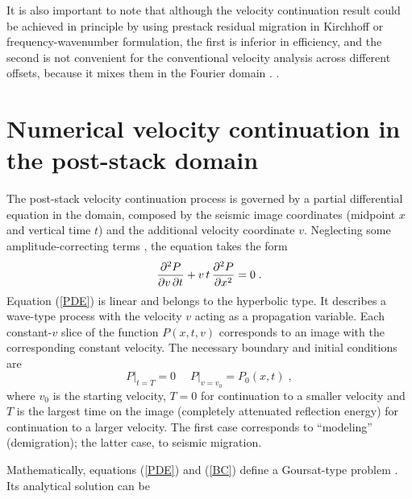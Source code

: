 It is also important to note that although the velocity continuation result
could be achieved in principle by using prestack residual migration in
Kirchhoff \cite[]{Etgen.sepphd.68} or frequency-wavenumber
\cite[]{GEO61-02-06050607} formulation, the first is inferior in efficiency, and
the second is not convenient for the conventional velocity analysis across
different offsets, because it mixes them in the Fourier domain
\cite[]{SEG-2000-09920995}.  
\cite[]{SEG-2001-02960299,sandf}  \cite{adler}.

\section{Numerical velocity continuation in the post-stack domain}
\par
The post-stack velocity continuation process is governed by a partial
differential equation in the domain, composed by the seismic image
coordinates (midpoint $x$ and vertical time $t$) and the additional
velocity coordinate $v$. Neglecting some amplitude-correcting terms
\cite[]{first}, the equation takes the form
\cite[]{Claerbout.sep.48.79}
\begin{equation}
  \label{PDE}
  {{\partial^2 P} \over {\partial v\, \partial t}} +
  v\,t\,{{\partial^2 P} \over {\partial x^2}} = 0\;.
\end{equation}
Equation (\ref{PDE}) is linear and belongs to the hyperbolic type. It
describes a wave-type process with the velocity $v$ acting as a
propagation variable. Each constant-$v$ slice of the function
$P(x,t,v)$ corresponds to an image with the corresponding constant
velocity. The necessary boundary and initial conditions are 
\begin{equation}
  \label{BC}
  \left.P\right|_{t=T} = 0\;\quad \left.P\right|_{v=v_0} = P_0 (x,t)\;,
\end{equation}
where $v_0$ is the starting velocity, $T=0$ for continuation to a smaller
velocity and $T$ is the largest time on the image (completely attenuated
reflection energy) for continuation to a larger velocity.  The first case
corresponds to ``modeling'' (demigration); the latter case, to seismic
migration.
\par
Mathematically, equations (\ref{PDE}) and (\ref{BC}) define a
Goursat-type problem \cite[]{kurant2}. Its analytical solution can be
